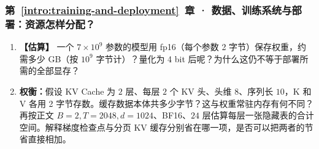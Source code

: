 \subsubsection*{第~\ref*{intro:training-and-deployment}~章 · 数据、训练系统与部署：资源怎样分配？}
\begin{enumerate}[label={},leftmargin=4.8em,itemsep=4pt]
\item[\textbf{C-114.}] \leavevmode{}\label{exercise:C-114}\label{exercise:weight-memory-budget}\textbf{【估算】} 一个 $7\times10^9$ 参数的模型用 fp16（每个参数 2 字节）保存权重，约需多少 GB（按 $10^9$ 字节计）？量化为 4 bit 后呢？为什么这仍不等于部署所需的全部显存？
\item[\textbf{C-115.}] \leavevmode{}\label{exercise:C-115}\label{exercise:kv-cache-bytes}\textbf{权衡：}假设 KV Cache 为 $2$ 层、每层 $2$ 个 KV 头、头维 $8$、序列长 $10$，K 和 V 各用 2 字节存数。缓存数据本体共多少字节？这与权重常驻内存有何不同？ 再按正文 $B=2,T=2048,d=1024$、BF16、$24$ 层估算每层一张隐藏表的合计空间。解释梯度检查点与分页 KV 缓存分别省在哪一项，是否可以把两者的节省直接相加。
\end{enumerate}

